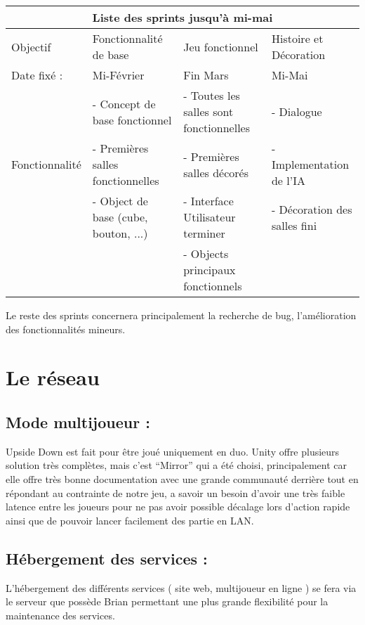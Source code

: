 \documentclass[a4paper,11pt]{article}
\begin{document}
\begin{tabular}{ |p{3cm}||p{3cm}|p{3cm}|p{3cm}|  }
 \hline
 \multicolumn{4}{|c|}{Liste des sprints jusqu'à mi-mai} \\
 \hline
 Objectif& Fonctionnalité de base  & Jeu fonctionnel & Histoire et Décoration\\
 \hline
 \hline
 Date fixé : & Mi-Février & Fin Mars & Mi-Mai\\
 \hline
 \multirow{3}{4em}{Fonctionnalité} & - Concept de base fonctionnel & - Toutes les salles sont fonctionnelles & - Dialogue\\ 
 & - Premières salles fonctionnelles & - Premières salles décorés & - Implementation de l'IA\\ 
 & - Object de base (cube, bouton, ...) & - Interface Utilisateur terminer & - Décoration des salles fini\\ 
 & & - Objects principaux fonctionnels & \\

 \hline
\end{tabular}


Le reste des sprints concernera principalement la recherche de bug, l'amélioration des 
fonctionnalités mineurs.



\section{Le réseau}

\subsection{Mode multijoueur :} 
	
Upside Down est fait pour être joué uniquement en duo. Unity offre plusieurs solution très complètes, 
mais c’est “Mirror” qui a été choisi, principalement car elle offre très bonne documentation avec une 
grande communauté derrière tout en répondant au contrainte de notre jeu, a savoir un besoin d’avoir une 
très faible latence entre les joueurs pour ne pas avoir possible décalage lors d’action rapide ainsi 
que de pouvoir lancer facilement des partie en LAN.


\subsection{Hébergement des services :}
	
L'hébergement des différents services ( site web, multijoueur en ligne ) se fera via le serveur 
que possède Brian permettant une plus grande flexibilité pour la maintenance des services.
\end{document}
